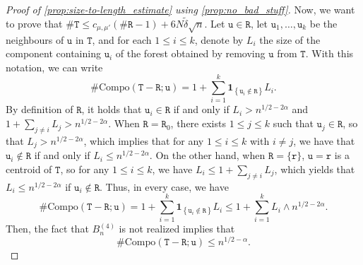 \documentclass[11pt,reqno]{amsart}
\newcommand{\1}{\mathbf{1}}
\newcommand{\0}{\mathbf{0}}
\newcommand{\ttT}{\mathtt{T}}
\newcommand{\ttR}{\mathtt{R}}
\newcommand{\ttr}{\mathtt{r}}
\newcommand{\ttu}{\mathtt{u}}
\newcommand{\I}[1]{{\mathbf 1}_{\left\{#1\right\}}}
\begin{document}
\begin{proof}[Proof of \cref{prop:size-to-length_estimate} using \cref{prop:no_bad_stuff}]
Now, we want to prove that $\#\ttT\leq c_{\mu,\mu'}(\#\ttR-1)+6N\tilde{\delta}\sqrt{n}$. Let $\ttu\in\ttR$, let $\ttu_1,\ldots,\ttu_k$ be the neighbours of $\ttu$ in $\ttT$, and for each $1\leq i\leq k$, denote by $L_i$ the size of the component containing $\ttu_i$ of the forest obtained by removing $\ttu$ from $\ttT$.
With this notation, we can write
\[\#\mathrm{Compo}(\ttT-\ttR;\ttu)=1+\sum_{i=1}^k \I{\ttu_i\notin\ttR} L_i.\]
By definition of $\ttR$, it holds that $\ttu_i\in\ttR$ if and only if $L_i>n^{1/2-2\alpha}$ and $1+\sum_{j\neq i}L_j>n^{1/2-2\alpha}$. When $\ttR=\ttR_0$, there exists $1\leq j\leq k$ such that $\ttu_j\in\ttR$, so that $L_j>n^{1/2-2\alpha}$, which implies that for any $1\leq i\leq k$ with $i\neq j$, we have that $\ttu_i\notin\ttR$ if and only if $L_i\leq n^{1/2-2\alpha}$. 
On the other hand, when $\ttR=\{\ttr\}$, $\ttu=\ttr$ is a centroid of $\ttT$, so for any $1\leq i\leq k$, we have $L_i\leq 1+\sum_{j\neq i}L_j$, which yields that $L_i\leq n^{1/2-2\alpha}$ if $\ttu_i\notin\ttR$. 
Thus, in every case, we have
\[\#\mathrm{Compo}(\ttT-\ttR;\ttu)=1+\sum_{i=1}^k \I{\ttu_i\notin\ttR} L_i\leq 1+\sum_{i=1}^k L_i\wedge n^{1/2-2\alpha}.\]
Then, the fact that $B_n^{(4)}$ is not realized implies that \[\#\mathrm{Compo}(\ttT-\ttR;\ttu)\leq n^{1/2-\alpha}.\]


\end{proof}
\end{document}
